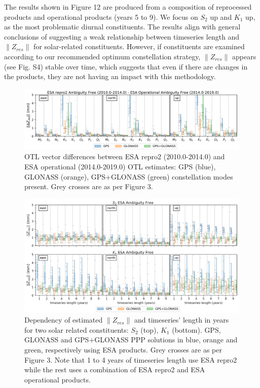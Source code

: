 \documentclass[se, manuscript]{copernicus}
\begin{document}
The results shown in Figure 12 are produced from a composition of reprocessed products and operational products (years 5 to 9). We focus on $S_2$ up and $K_1$ up, as the most problematic diurnal constituents. The results align with general conclusions of \cite{Yuan2013} suggesting a weak relationship between timeseries length and $\|Z_{res}\|$ for solar-related constituents. However, if constituents are examined according to our recommended optimum constellation strategy, $\|Z_{res}\|$ appears (see Fig. S4) stable over time, which suggests that even if there are changes in the products, they are not having an impact with this methodology.

\begin{figure}[t]
\includegraphics[width=17cm]{fig12.png}
\caption{OTL vector differences between ESA repro2 (2010.0-2014.0) and ESA operational (2014.0-2019.0) OTL estimates: GPS (blue), GLONASS (orange), GPS+GLONASS (green) constellation modes present. Grey crosses are as per Figure 3.}
\end{figure}



\begin{figure}[t]
\includegraphics[width=17cm]{fig11.png}
\caption{Dependency of estimated $\|Z_{res}\|$ and timeseries’ length in years for two solar related constituents: $S_2$ (top), $K_1$ (bottom). GPS, GLONASS and GPS+GLONASS PPP solutions in blue, orange and green, respectively using ESA products. Grey crosses are as per Figure 3. Note that 1 to 4 years of timeseries length use ESA repro2 while the rest uses a combination of ESA repro2 and ESA operational products.}
\end{figure}
\end{document}
